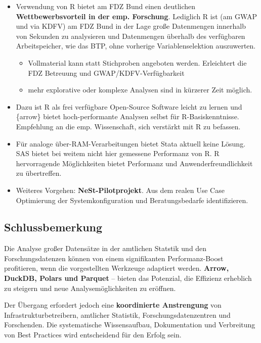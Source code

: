\documentclass[
  german,
  10pt,
  twoside]{article}
\providecommand{\tightlist}{%
  \setlength{\itemsep}{0pt}\setlength{\parskip}{0pt}}
\begin{document}
\begin{itemize}
\tightlist
\item
  Verwendung von R bietet am FDZ Bund einen deutlichen
  \textbf{Wettbewerbsvorteil in der emp. Forschung}. Lediglich R ist (am
  GWAP und via KDFV) am FDZ Bund in der Lage große Datenmengen innerhalb
  von Sekunden zu analysieren und Datenmengen überhalb des verfügbaren
  Arbeitspeicher, wie das BTP, ohne vorherige Variablenselektion
  auszuwerten.

  \begin{itemize}
  \tightlist
  \item
    Vollmaterial kann statt Stichproben angeboten werden. Erleichtert
    die FDZ Betreuung und GWAP/KDFV-Verfügbarkeit
  \item
    mehr explorative oder komplexe Analysen sind in kürzerer Zeit
    möglich.
  \end{itemize}
\item
  Dazu ist R als frei verfügbare Open-Source Software leicht zu lernen
  und \{arrow\} bietet hoch-performante Analysen selbst für
  R-Basiskenntnisse. Empfehlung an die emp. Wissenschaft, sich verstärkt
  mit R zu befassen.
\item
  Für analoge über-RAM-Verarbeitungen bietet Stata aktuell keine Lösung.
  SAS bietet bei weitem nicht hier gemessene Performanz von R. R
  hervorragende Möglichkeiten bietet Performanz und
  Anwenderfreundlichkeit zu übertreffen.
\item
  Weiteres Vorgehen: \textbf{NeSt-Pilotprojekt}. Aus dem realen Use Case
  Optimierung der Systemkonfiguration und Beratungsbedarfe
  identifizieren.
\end{itemize}

\subsection{Schlussbemerkung}\label{schlussbemerkung}

Die Analyse großer Datensätze in der amtlichen Statstik und den
Forschungsdatenzen können von einem signifikanten Performanz-Boost
profitieren, wenn die vorgestellten Werkzeuge adaptiert werden.
\textbf{Arrow, DuckDB, Polars und Parquet} -- bieten das Potenzial, die
Effizienz erheblich zu steigern und neue Analysemöglichkeiten zu
eröffnen.

Der Übergang erfordert jedoch eine \textbf{koordinierte Anstrengung} von
Infrastrukturbetreibern, amtlicher Statistik, Forschungsdatenzentren und
Forschenden. Die systematische Wissensaufbau, Dokumentation und
Verbreitung von Best Practices wird entscheidend für den Erfolg sein.
\end{document}
